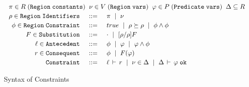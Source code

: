 \begin{figure*}[!ht]

\[
{
\renewcommand{\arraystretch}{1.2}
\setlength{\arraycolsep}{7pt}
\begin{array}{rcl} 

\multicolumn{3}{c}{
   \pi \in R \; \mathtt{ (Region \; constants) } \;\;
   \nu \in V \; \mathtt{ (Region \; vars) } \;\;
   \varphi \in P \; \mathtt{ (Predicate \; vars) } \;\;
   \Delta \subseteq R
} \\

\rho \in \mathtt{Region \; Identifiers} & \coloneqq & \pi \ALT \nu \\

\phi \in \mathtt{Region \; Constraint} & \coloneqq & true \ALT \rho \outlives \rho \ALT \phi \conj \phi \\

F \in \mathtt{Substitution} & \coloneqq & \cdot \ALT [\rho/\rho]F \\

\ell \in \mathtt{Antecedent} & \coloneqq & \phi \ALT \varphi \ALT \varphi \conj \phi \\

r \in \mathtt{Consequent} & \coloneqq & \phi \ALT F(\varphi) \\

\mathtt{Constraint} & \coloneqq & \isvalid{\ell}{r} \ALT \nu \in \Delta \ALT \tywf{\Delta}{\varphi} \\

\end{array}
}
\]

\caption{Syntax of Constraints}
\label{fig:constraint-syntax}
\end{figure*}
